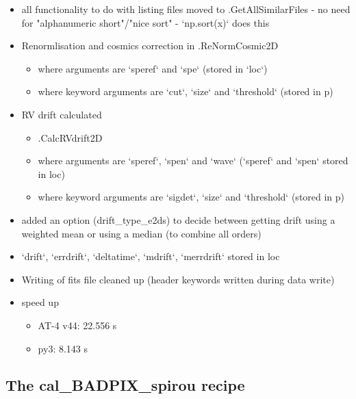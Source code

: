 \begin{itemize}
\item all functionality to do with listing files moved to \spirouImage{\hskip 0pt}.GetAllSimilarFiles - no need for "alphanumeric short"/"nice sort" - `np.sort(x)` does this
    
\item Renormlisation and cosmics correction in \spirouRV.ReNormCosmic2D
	\begin{itemize}
	\item where arguments are `speref` and `spe` (stored in `loc`)
	\item where keyword arguments are `cut`, `size` and `threshold` (stored in p)
	\end{itemize}

\item RV drift calculated
	\begin{itemize}
	\item \spirouRV.CalcRVdrift2D
	\item where arguments are `speref`, `spen` and `wave` (`speref` and `spen` stored in loc)
	\item where keyword arguments are `sigdet`, `size` and `threshold` (stored in p)
	\end{itemize}

\item added an option (drift\_type\_e2ds) to decide between getting drift using a weighted mean or using a median (to combine all orders)

\item `drift`, `errdrift`, `deltatime`, `mdrift`, `merrdrift` stored in loc

\item Writing of fits file cleaned up (header keywords written during data write)

\item speed up
	\begin{itemize}
	\item AT-4 v44: 22.556 s
	\item py3:  8.143 s
	\end{itemize}

\end{itemize}


\subsection{The cal\_BADPIX\_spirou recipe}
\label{ch:changelog:At4:cal_BADPIX_spirou}

